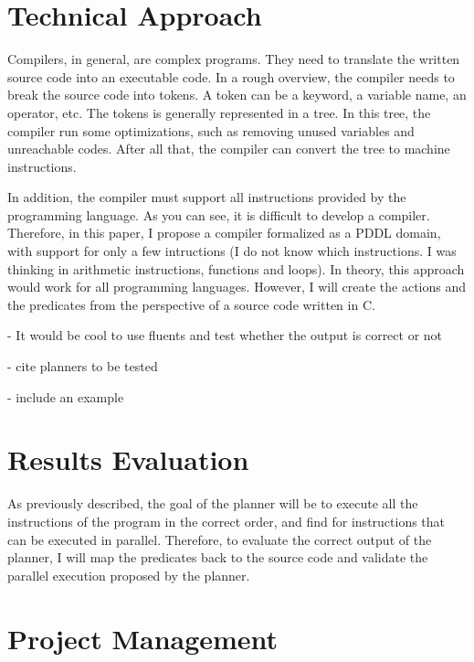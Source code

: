 \documentclass[letterpaper]{article}
\begin{document}

\section{Technical Approach} \label{technical-approach}

Compilers, in general, are complex programs. They need to translate the written source code into an executable code. In a rough overview, the compiler needs to break the source code into tokens. A token can be a keyword, a variable name, an operator, etc. The tokens is generally represented in a tree. In this tree, the compiler run some optimizations, such as removing unused variables and unreachable codes. After all that, the compiler can convert the tree to machine instructions.

In addition, the compiler must support all instructions provided by the programming language. As you can see, it is difficult to develop a compiler. Therefore, in this paper, I propose a compiler formalized as a PDDL domain, with support for only a few intructions (I do not know which instructions. I was thinking in arithmetic instructions, functions and loops). In theory, this approach would work for all programming languages. However, I will create the actions and the predicates from the perspective of a source code written in C.

- It would be cool to use fluents and test whether the output is correct or not

- cite planners to be tested

- include an example


\section{Results Evaluation}

As previously described, the goal of the planner will be to execute all the instructions of the program in the correct order, and find for instructions that can be executed in parallel. Therefore, to evaluate the correct output of the planner, I will map the predicates back to the source code and validate the parallel execution proposed by the planner.


\section{Project Management}
\end{document}

